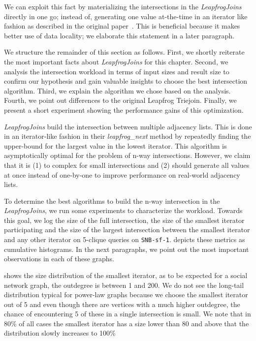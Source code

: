 We can exploit this fact by materializing the intersections in the \textit{LeapfrogJoins} directly
in one go; instead of, generating one value at-the-time in an iterator like fashion as described in the
original paper~\cite{lftj}.
This is beneficial because it makes better use of data locality; we elaborate this statement in a later
paragraph.

We structure the remainder of this section as follows.
First, we shortly reiterate the most important facts about \textit{LeapfrogJoins} for this chapter.
Second, we analysis the intersection workload in terms of input sizes and result size to confirm our hypothesis
and gain valuable insights to choose the best intersection algorithm.
Third, we explain the algorithm we chose based on the analysis.
Fourth, we point out differences to the original Leapfrog Triejoin.
Finally, we present a short experiment showing the performance gains of this optimization.

\textit{LeapfrogJoins} build the intersection between multiple adjacency lists.
This is done in an iterator-like fashion in their \textit{leapfrog\_next} method by repeatedly finding the upper-bound for the largest
value in the lowest iterator.
This algorithm is asymptotically optimal for the problem of n-way intersections.
However, we claim that it is (1) to complex for small intersections and (2) should generate all values at once instead of one-by-one to
improve performance on real-world adjacency lists.

To determine the best algorithms to build the n-way intersection in the \textit{LeapfrogJoins},
we run some experiments to characterize the workload.
Towards this goal, we log the size of the full intersection, the size of the smallest iterator participating
and the size of the largest intersection between the smallest iterator and any other iterator on 5-clique queries on \texttt{SNB-sf-1}.
 depicts these metrics as cumulative histograms.
In the next paragraphs, we point out the most important observations in each of these graphs.


 shows the size distribution of the smallest iterator, as to be expected for a social network
graph, the outdegree is between 1 and 200.
We do not see the long-tail distribution typical for power-law graphs because we choose the smallest iterator out of 5 and even
though there are vertices with a much higher outdegree, the chance of encountering 5 of these in a single intersection is small.
We note that in 80\% of all cases the smallest iterator has a size lower than 80 and above that the distribution slowly increases to 100\%

